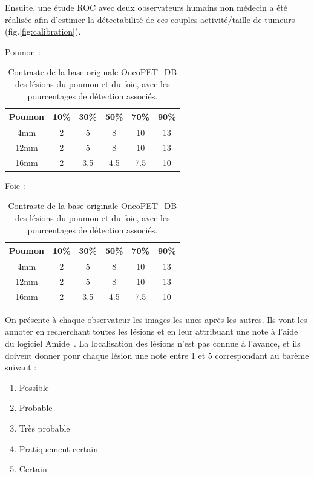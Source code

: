 Ensuite, une étude ROC avec deux observateurs humains non médecin a été réalisée afin d'estimer la détectabilité de ces couples activité/taille de tumeurs (fig.\ref{fig:calibration}). 





\begin{table}
\centering
Poumon :\\
\begin{tabular}{|c||c|c|c|c|c|}
 \hline
Poumon	& 10\% & 30\% & 50\% & 70\% & 90\% \\
\hline
4mm	& 2    &  5   &  8   & 10   & 13   \\
\hline
12mm    & 2    &  5   &  8   & 10   & 13   \\
\hline
16mm    & 2    &  3.5 &  4.5 & 7.5  & 10   \\
\hline
\end{tabular}

\vspace{0.5cm}

Foie :\\
\begin{tabular}{|c||c|c|c|c|c|}
 \hline
Poumon	& 10\% & 30\% & 50\% & 70\% & 90\% \\
\hline
4mm	& 2    &  5   &  8   & 10   & 13   \\
\hline
12mm    & 2    &  5   &  8   & 10   & 13   \\
\hline
16mm    & 2    &  3.5 &  4.5 & 7.5  & 10   \\
\hline
\end{tabular}
\caption[Contraste de la base originale OncoPET\_DB des lésions du poumon et du foie pour létude de détectabilité]{Contraste de la base originale OncoPET\_DB des lésions du poumon et du foie, avec les pourcentages de détection associés.}
\label{fig:contrtasteFoiePoumonOrig}
\end{table}


On présente à chaque observateur les images les unes après les autres. Ils vont les annoter en recherchant toutes les lésions et en leur attribuant une note à l'aide du logiciel Amide~\cite{loening2003amide}. La localisation des lésions n'est pas connue à l'avance, et ils doivent donner pour chaque lésion une note entre 1 et 5 correspondant au barème suivant :

\begin{enumerate}
\item Possible
\item Probable
\item Très probable
\item Pratiquement  certain
\item Certain
\end{enumerate}

